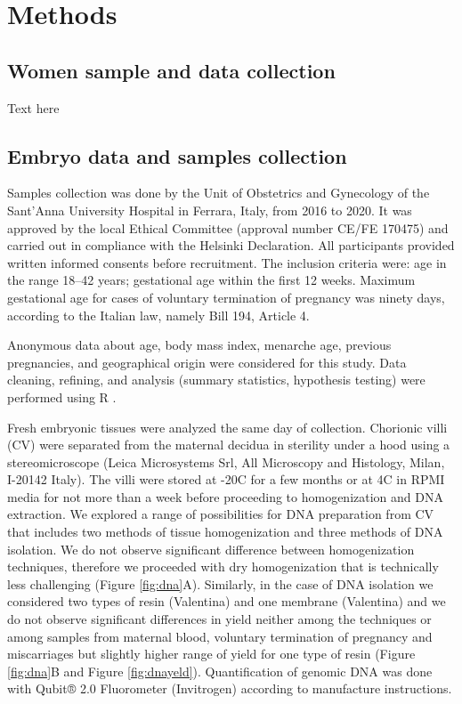 \section*{Methods}

\subsection*{Women sample and data collection}
Text here 

\subsection*{Embryo data and samples collection}
Samples collection was done by the Unit of Obstetrics and Gynecology of the Sant’Anna University Hospital in Ferrara, Italy, from 2016 to 2020. It was approved by the local Ethical Committee (approval number CE/FE 170475) and carried out in compliance with the Helsinki Declaration. All participants provided written informed consents before recruitment. The inclusion criteria were: age in the range 18–42 years; gestational age within the first 12 weeks. Maximum gestational age for cases of voluntary termination of pregnancy was ninety days, according to the Italian law, namely Bill 194, Article 4. 


Anonymous data about age, body mass index, menarche age, previous pregnancies, and geographical origin were considered for this study. Data cleaning, refining, and analysis (summary statistics, hypothesis testing) were performed using R \cite{R}.


Fresh embryonic tissues were analyzed the same day of collection. Chorionic villi (CV) were separated from the maternal decidua in sterility under a hood using a stereomicroscope (Leica Microsystems Srl, All Microscopy and Histology, Milan, I-20142 Italy). The villi were stored at -20\textdegree  C for a few months or at 4\textdegree  C in RPMI media for not more than a week before proceeding to homogenization and DNA extraction. We explored a range of possibilities for DNA preparation from CV that includes two methods of tissue homogenization and three methods of DNA isolation. We do not observe significant difference between homogenization techniques, therefore we proceeded with dry homogenization that is technically less challenging (Figure \ref{fig:dna}A). Similarly, in the case of DNA isolation we considered two types of resin (Valentina) and one membrane (Valentina) and we do not observe significant differences in yield neither among the techniques or among samples from maternal blood, voluntary termination of pregnancy and miscarriages but slightly higher range of yield for one type of resin (Figure \ref{fig:dna}B and Figure \ref{fig:dnayeld}). Quantification of genomic DNA was done with Qubit® 2.0 Fluorometer (Invitrogen) according to manufacture instructions.

